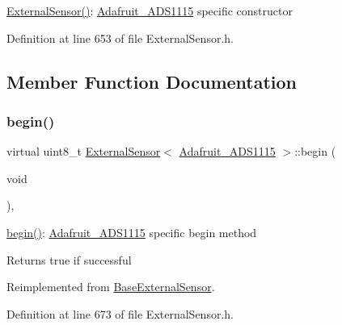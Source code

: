 \hyperlink{class_external_sensor_3_01_adafruit___a_d_s1115_01_4_aff5ed681a7c261462092516a5cc571e1}{External\+Sensor()}\+: \hyperlink{class_adafruit___a_d_s1115}{Adafruit\+\_\+\+A\+D\+S1115} specific constructor 

Definition at line 653 of file External\+Sensor.\+h.



\subsection{Member Function Documentation}
\mbox{\label{class_external_sensor_3_01_adafruit___a_d_s1115_01_4_a208a33108a08459d385b38cb2962376b}} 
\subsubsection{\texorpdfstring{begin()}{begin()}}
{\footnotesize\ttfamily virtual uint8\+\_\+t \hyperlink{class_external_sensor}{External\+Sensor}$<$ \hyperlink{class_adafruit___a_d_s1115}{Adafruit\+\_\+\+A\+D\+S1115} $>$\+::begin (\begin{DoxyParamCaption}\item[{void}]{ }\end{DoxyParamCaption})\hspace{0.3cm}{\ttfamily [inline]}, {\ttfamily [virtual]}}

\hyperlink{class_external_sensor_3_01_adafruit___a_d_s1115_01_4_a208a33108a08459d385b38cb2962376b}{begin()}\+: \hyperlink{class_adafruit___a_d_s1115}{Adafruit\+\_\+\+A\+D\+S1115} specific begin method

\begin{DoxyReturn}{Returns}
true if successful 
\end{DoxyReturn}


Reimplemented from \hyperlink{class_base_external_sensor_a87d132803d4f4fdd4e66332809f0c9a0}{Base\+External\+Sensor}.



Definition at line 673 of file External\+Sensor.\+h.

\mbox{\label{class_external_sensor_3_01_adafruit___a_d_s1115_01_4_aa9ce4b3899967e9decdba76decf292af}} 
